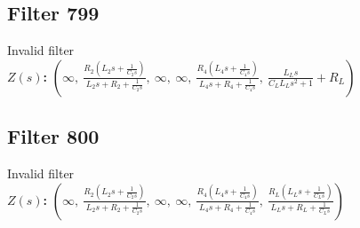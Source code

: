 \documentclass{article}
\begin{document}
\subsection*{Filter 799}
Invalid filter \\ 
\textbf{$Z(s)$:} $\left( \infty, \  \frac{R_{2} \left(L_{2} s + \frac{1}{C_{2} s}\right)}{L_{2} s + R_{2} + \frac{1}{C_{2} s}}, \  \infty, \  \infty, \  \frac{R_{4} \left(L_{4} s + \frac{1}{C_{4} s}\right)}{L_{4} s + R_{4} + \frac{1}{C_{4} s}}, \  \frac{L_{L} s}{C_{L} L_{L} s^{2} + 1} + R_{L}\right)$ \\ 
\subsection*{Filter 800}
Invalid filter \\ 
\textbf{$Z(s)$:} $\left( \infty, \  \frac{R_{2} \left(L_{2} s + \frac{1}{C_{2} s}\right)}{L_{2} s + R_{2} + \frac{1}{C_{2} s}}, \  \infty, \  \infty, \  \frac{R_{4} \left(L_{4} s + \frac{1}{C_{4} s}\right)}{L_{4} s + R_{4} + \frac{1}{C_{4} s}}, \  \frac{R_{L} \left(L_{L} s + \frac{1}{C_{L} s}\right)}{L_{L} s + R_{L} + \frac{1}{C_{L} s}}\right)$ \\ 
\end{document}

